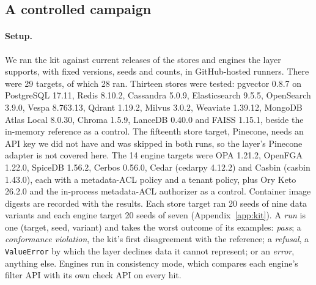 \subsection{A controlled campaign}\label{sec:conf-campaign}

\paragraph{Setup.}
We ran the kit against current releases of the stores and engines the layer supports, with fixed
versions, seeds and counts, in GitHub-hosted runners. There were 29 targets, of which 28 ran. Thirteen
stores were tested: pgvector 0.8.7 on PostgreSQL 17.11, Redis 8.10.2, Cassandra 5.0.9, Elasticsearch
9.5.5, OpenSearch 3.9.0, Vespa 8.763.13, Qdrant 1.19.2, Milvus 3.0.2, Weaviate 1.39.12, MongoDB Atlas
Local 8.0.30, Chroma 1.5.9, LanceDB 0.40.0 and FAISS 1.15.1, beside the in-memory reference as a
control. The fifteenth store target, Pinecone, needs an API key we did not have and was skipped in
both runs, so the layer's Pinecone adapter is not covered here. The 14
engine targets were OPA 1.21.2, OpenFGA 1.22.0, SpiceDB 1.56.2, Cerbos 0.56.0, Cedar (cedarpy 4.12.2) and Casbin
(casbin 1.43.0), each with a metadata-ACL policy and a tenant policy, plus Ory Keto 26.2.0 and the in-process
metadata-ACL authorizer as a control. Container image digests are recorded with the results. Each
store target ran 20 seeds of nine data variants and each engine target 20 seeds of seven
(Appendix~\ref{app:kit}). A \emph{run} is one (target, seed, variant) and takes the worst outcome of
its examples: \emph{pass}; a \emph{conformance violation}, the kit's first disagreement with the
reference; a \emph{refusal}, a \texttt{ValueError} by which the layer declines data it cannot
represent; or an \emph{error}, anything else. Engines run in consistency mode, which compares each
engine's filter API with its own check API on every hit.

